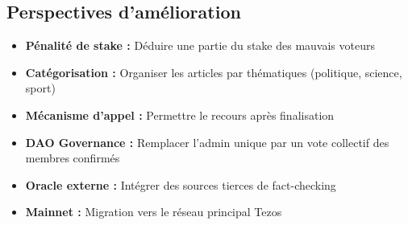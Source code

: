 \documentclass[12pt,a4paper]{article}
\begin{document}
\subsection{Perspectives d'amélioration}

\begin{itemize}
  \item \textbf{Pénalité de stake :} Déduire une partie du stake des mauvais voteurs
  \item \textbf{Catégorisation :} Organiser les articles par thématiques (politique, science, sport)
  \item \textbf{Mécanisme d'appel :} Permettre le recours après finalisation
  \item \textbf{DAO Governance :} Remplacer l'admin unique par un vote collectif des membres confirmés
  \item \textbf{Oracle externe :} Intégrer des sources tierces de fact-checking
  \item \textbf{Mainnet :} Migration vers le réseau principal Tezos
\end{itemize}

\vspace{1.5cm}
\begin{center}
\end{center}
\end{document}
